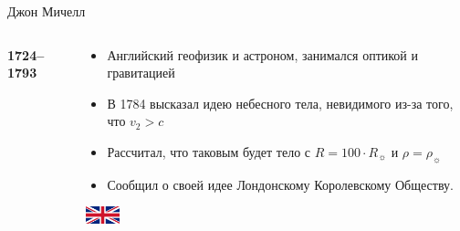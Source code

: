\documentclass[usenames,dvipsnames,pdftex,unicode,hidelinks]{beamer}
\begin{document}
\begin{frame}{Джон Мичелл}
\begin{columns}[t]
\begin{column}{0.25\textwidth}
\begin{center}
          \textbf{1724--1793}
        \end{center}
      \end{column}
      \begin{column}{0.75\textwidth}
        \begin{itemize}
          \item Английский геофизик и астроном, занимался оптикой и гравитацией
          \item В \alert{1784} высказал идею небесного тела, невидимого из-за того, что $v_2 > c$
          \item Рассчитал, что таковым будет тело с $R = 100\cdot R_{\sun}$ и $\rho = \rho_{\sun}$
          \item Сообщил о своей идее Лондонскому Королевскому Обществу.
        \end{itemize}
        \begin{center}
          \vspace{5mm}
          \includegraphics[width=1cm]{britain}
        \end{center}
      \end{column}
    \end{columns}
  \end{frame}
    
\end{document}
